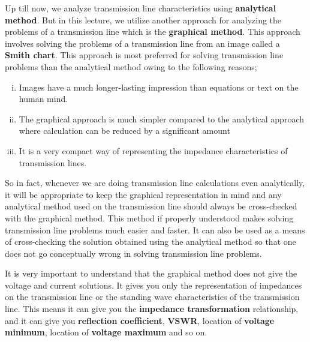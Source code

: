 Up till now, we analyze transmission line characteristics using \textbf{analytical method}. But in this lecture, we utilize another approach for analyzing the problems of a transmission line which is the \textbf{graphical method}. This approach involves solving the problems of a transmission line from an image called a \textbf{Smith chart}. This approach is most preferred for solving transmission line problems than the analytical method owing to the following reasons;
\begin{enumerate}[(i)]
\item Images have a much longer-lasting impression than equations or text on the human mind.
\item The graphical approach is much simpler compared to the analytical approach where calculation can be reduced by a significant amount
\item It is a very compact way of representing the impedance characteristics of transmission lines.
\end{enumerate}
So in fact, whenever we are doing transmission line calculations even analytically, it will be appropriate to keep the graphical representation in mind and any analytical method used on the transmission line should always be cross-checked with the graphical method.
This method if properly understood makes solving transmission line problems much easier and faster. It can also be used as a means of cross-checking the solution obtained using the analytical method so that one does not go conceptually wrong in solving transmission line problems.

It is very important to understand that the graphical method does not give the voltage and current solutions. It gives you only the representation of impedances on the transmission line or the standing wave characteristics of the transmission line. This means it can give you the \textbf{impedance transformation} relationship, and it can give you \textbf{reflection coefficient}, \textbf{VSWR}, location of \textbf{voltage minimum}, location of \textbf{voltage maximum} and so on.

